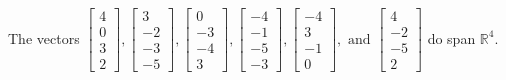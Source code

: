 \begin{exercise}
\begin{exerciseStatement}
  \end{exerciseStatement}
  \begin{exerciseAnswer}
   The vectors \(\left[\begin{array}{r}
4 \\
0 \\
3 \\
2
\end{array}\right] , \left[\begin{array}{r}
3 \\
-2 \\
-3 \\
-5
\end{array}\right] , \left[\begin{array}{r}
0 \\
-3 \\
-4 \\
3
\end{array}\right] , \left[\begin{array}{r}
-4 \\
-1 \\
-5 \\
-3
\end{array}\right] , \left[\begin{array}{r}
-4 \\
3 \\
-1 \\
0
\end{array}\right] , \text{ and } \left[\begin{array}{r}
4 \\
-2 \\
-5 \\
2
\end{array}\right]\) 
  	 do  
	span \(\mathbb{R}^4\).
  


  \end{exerciseAnswer}
\end{exercise}